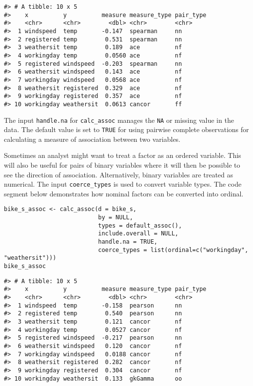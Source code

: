 \begin{verbatim}
#> # A tibble: 10 x 5
#>    x          y          measure measure_type pair_type
#>    <chr>      <chr>        <dbl> <chr>        <chr>    
#>  1 windspeed  temp       -0.147  spearman     nn       
#>  2 registered temp        0.531  spearman     nn       
#>  3 weathersit temp        0.189  ace          nf       
#>  4 workingday temp        0.0560 ace          nf       
#>  5 registered windspeed  -0.203  spearman     nn       
#>  6 weathersit windspeed   0.143  ace          nf       
#>  7 workingday windspeed   0.0568 ace          nf       
#>  8 weathersit registered  0.329  ace          nf       
#>  9 workingday registered  0.357  ace          nf       
#> 10 workingday weathersit  0.0613 cancor       ff
\end{verbatim}

The input \texttt{handle.na} for \texttt{calc\_assoc} manages the \texttt{NA} or missing value in the data. The default value is set to \texttt{TRUE} for using pairwise complete observations for calculating a measure of association between two variables.

Sometimes an analyst might want to treat a factor as an ordered variable. This will also be useful for pairs of binary variables where it will then be possible to see the direction of association. Alternatively, binary variables are treated as numerical. The input \texttt{coerce\_types} is used to convert variable types. The code segment below demonstrates how nominal factors can be converted into ordinal.

\begin{verbatim}
bike_s_assoc <- calc_assoc(d = bike_s,
                           by = NULL,
                           types = default_assoc(),
                           include.overall = NULL,
                           handle.na = TRUE,
                           coerce_types = list(ordinal=c("workingday", "weathersit")))
bike_s_assoc
\end{verbatim}

\begin{verbatim}
#> # A tibble: 10 x 5
#>    x          y          measure measure_type pair_type
#>    <chr>      <chr>        <dbl> <chr>        <chr>    
#>  1 windspeed  temp       -0.158  pearson      nn       
#>  2 registered temp        0.540  pearson      nn       
#>  3 weathersit temp        0.121  cancor       nf       
#>  4 workingday temp        0.0527 cancor       nf       
#>  5 registered windspeed  -0.217  pearson      nn       
#>  6 weathersit windspeed   0.120  cancor       nf       
#>  7 workingday windspeed   0.0188 cancor       nf       
#>  8 weathersit registered  0.282  cancor       nf       
#>  9 workingday registered  0.304  cancor       nf       
#> 10 workingday weathersit  0.133  gkGamma      oo
\end{verbatim}

